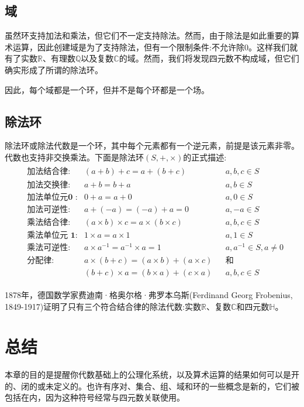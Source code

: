 \subsection{域}
虽然环支持加法和乘法，但它们不一定支持除法。然而，由于除法是如此重要的算术运算，因此创建域是为了支持除法，但有一个限制条件:不允许除0。这样我们就有了实数$\mathbb{R}$、有理数$\mathbb{Q}$以及复数$\mathbb{C}$的域。然而，我们将发现四元数不构成域，但它们确实形成了所谓的除法环。

因此，每个域都是一个环，但并不是每个环都是一个场。

\subsection{除法环}
除法环或除法代数是一个环，其中每个元素都有一个逆元素，前提是该元素非零。代数也支持非交换乘法。下面是除法环$(S,+, \times)$的正式描述:
\begin{align*}
    \begin{aligned}
        &\textbf{加法结合律: } & (a+b)+c=a+(b+c) && a, b, c \in S \\
        &\textbf{加法交换律: } & a+b=b+a && a, b \in S\\
        &\textbf{加法单位元0 :}    & 0+a=a+0 && a, 0 \in S\\
        &\textbf{加法可逆性: }       & a+(-a)=(-a)+a=0 && a,-a \in S\\
        &\textbf{乘法结合律:} & (a \times b) \times c=a \times(b \times c) && a, b, c \in S\\
        &\textbf{乘法单位元 1:} &1 \times a=a \times 1 && a, 1 \in S\\
        &\textbf{乘法可逆性:} & a \times a^{-1}=a^{-1} \times a=1 && a, a^{-1} \in S, a \neq 0\\
        &\textbf{分配律:} & a \times(b+c)=(a \times b)+(a \times c) && \text{和}\\
        &&(b+c) \times a=(b \times a)+(c \times a) && a, b, c \in S
    \end{aligned}
\end{align*}

1878年，德国数学家费迪南·格奥尔格·弗罗本乌斯(Ferdinand Georg Frobenius, 1849-1917)证明了只有三个符合结合律的除法代数:实数$\mathbb{R}$、复数$\mathbb{C}$和四元数$\mathbb{H}$。

\section{总结}
本章的目的是提醒你代数基础上的公理化系统，以及算术运算的结果如何可以是开的、闭的或未定义的。也许有序对、集合、组、域和环的一些概念是新的，它们被包括在内，因为这种符号经常与四元数关联使用。

